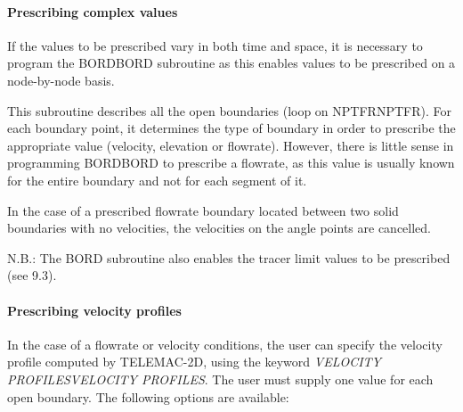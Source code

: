 \documentclass{article} %
\begin{document}
\paragraph{ Prescribing complex values}

 If the values to be prescribed vary in both time and space, it is necessary to program the BORDBORD subroutine as this enables values to be prescribed on a node-by-node basis.

 This subroutine describes all the open boundaries (loop on NPTFRNPTFR). For each boundary point, it determines the type of boundary in order to prescribe the appropriate value (velocity, elevation or flowrate). However, there is little sense in programming BORDBORD to prescribe a flowrate, as this value is usually known for the entire boundary and not for each segment of it.

 In the case of a prescribed flowrate boundary located between two solid boundaries with no velocities, the velocities on the angle points are cancelled.

 N.B.: The BORD subroutine also enables the tracer limit values to be prescribed (see 9.3).


\paragraph{ Prescribing velocity profiles}

 In the case of a flowrate or velocity conditions, the user can specify the velocity profile computed by TELEMAC-2D, using the keyword \textit{VELOCITY PROFILESVELOCITY PROFILES}. The user must supply one value for each open boundary. The following options are available:
\end{document}
